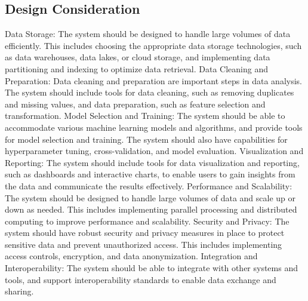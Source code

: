 \subsection{Design Consideration}
\justify \quad
Data Storage: The system should be designed to handle large volumes of data efficiently. This includes choosing the appropriate data storage technologies, such as data warehouses, data lakes, or cloud storage, and implementing data partitioning and indexing to optimize data retrieval.
\newline 
\justify\quad
Data Cleaning and Preparation: Data cleaning and preparation are important steps in data analysis. The system should include tools for data cleaning, such as removing duplicates and missing values, and data preparation, such as feature selection and transformation.
\newline 
\justify\quad
Model Selection and Training: The system should be able to accommodate various machine learning models and algorithms, and provide tools for model selection and training. The system should also have capabilities for hyperparameter tuning, cross-validation, and model evaluation.
\newline 
\justify\quad
Visualization and Reporting: The system should include tools for data visualization and reporting, such as dashboards and interactive charts, to enable users to gain insights from the data and communicate the results effectively.
\newline 
\justify\quad
Performance and Scalability: The system should be designed to handle large volumes of data and scale up or down as needed. This includes implementing parallel processing and distributed computing to improve performance and scalability.
\newline 
\justify\quad
Security and Privacy: The system should have robust security and privacy measures in place to protect sensitive data and prevent unauthorized access. This includes implementing access controls, encryption, and data anonymization.
\newline 
\justify\quad
Integration and Interoperability: The system should be able to integrate with other systems and tools, and support interoperability standards to enable data exchange and sharing.

\newpage